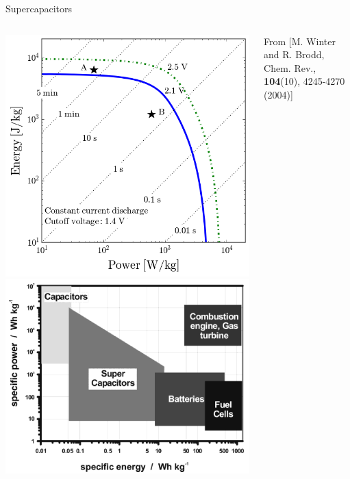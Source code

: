 \begin{frame}{Supercapacitors}

\begin{columns}
\includegraphics[width=\linewidth]{rawfigs/supercapacitor/ragone_plot}
\tiny
\includegraphics[width=\linewidth]{rawfigs/supercapacitor/simplified_ragone_plot}

From [M. Winter and R. Brodd, Chem. Rev., \textbf{104}(10), 4245-4270 (2004)]

\end{columns}
\end{frame}

